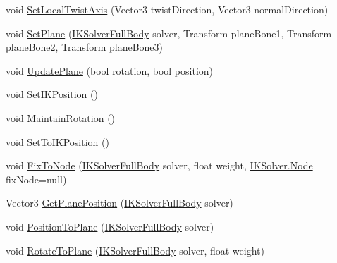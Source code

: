 \begin{DoxyCompactItemize}
\item 
void \mbox{\hyperlink{class_root_motion_1_1_final_i_k_1_1_i_k_mapping_1_1_bone_map_a2e6a7e07eeb97992653355ba6db925fa}{Set\+Local\+Twist\+Axis}} (Vector3 twist\+Direction, Vector3 normal\+Direction)
\item 
void \mbox{\hyperlink{class_root_motion_1_1_final_i_k_1_1_i_k_mapping_1_1_bone_map_aa4df02feb2ddc1e0471ba6c7ec6185e3}{Set\+Plane}} (\mbox{\hyperlink{class_root_motion_1_1_final_i_k_1_1_i_k_solver_full_body}{I\+K\+Solver\+Full\+Body}} solver, Transform plane\+Bone1, Transform plane\+Bone2, Transform plane\+Bone3)
\item 
void \mbox{\hyperlink{class_root_motion_1_1_final_i_k_1_1_i_k_mapping_1_1_bone_map_a2c84de4067f45adbf3392fb03af268ee}{Update\+Plane}} (bool rotation, bool position)
\item 
void \mbox{\hyperlink{class_root_motion_1_1_final_i_k_1_1_i_k_mapping_1_1_bone_map_a380c468f5bffa23275d768c3a21b8db1}{Set\+I\+K\+Position}} ()
\item 
void \mbox{\hyperlink{class_root_motion_1_1_final_i_k_1_1_i_k_mapping_1_1_bone_map_a1cb855fb88a06801d633a731967b8c09}{Maintain\+Rotation}} ()
\item 
void \mbox{\hyperlink{class_root_motion_1_1_final_i_k_1_1_i_k_mapping_1_1_bone_map_a60115fb8d35ea5fb4dab3ffd32e3d52a}{Set\+To\+I\+K\+Position}} ()
\item 
void \mbox{\hyperlink{class_root_motion_1_1_final_i_k_1_1_i_k_mapping_1_1_bone_map_a2b6a806ce90035aa4fd1499a6a4a3ba1}{Fix\+To\+Node}} (\mbox{\hyperlink{class_root_motion_1_1_final_i_k_1_1_i_k_solver_full_body}{I\+K\+Solver\+Full\+Body}} solver, float weight, \mbox{\hyperlink{class_root_motion_1_1_final_i_k_1_1_i_k_solver_1_1_node}{I\+K\+Solver.\+Node}} fix\+Node=null)
\item 
Vector3 \mbox{\hyperlink{class_root_motion_1_1_final_i_k_1_1_i_k_mapping_1_1_bone_map_a38e279dc98d1d43d26b27366b38318f1}{Get\+Plane\+Position}} (\mbox{\hyperlink{class_root_motion_1_1_final_i_k_1_1_i_k_solver_full_body}{I\+K\+Solver\+Full\+Body}} solver)
\item 
void \mbox{\hyperlink{class_root_motion_1_1_final_i_k_1_1_i_k_mapping_1_1_bone_map_afca137343db4f579fe90489021c9d4ed}{Position\+To\+Plane}} (\mbox{\hyperlink{class_root_motion_1_1_final_i_k_1_1_i_k_solver_full_body}{I\+K\+Solver\+Full\+Body}} solver)
\item 
void \mbox{\hyperlink{class_root_motion_1_1_final_i_k_1_1_i_k_mapping_1_1_bone_map_a900b7c9f6b7925969983269598c645bd}{Rotate\+To\+Plane}} (\mbox{\hyperlink{class_root_motion_1_1_final_i_k_1_1_i_k_solver_full_body}{I\+K\+Solver\+Full\+Body}} solver, float weight)

\end{DoxyCompactItemize}
